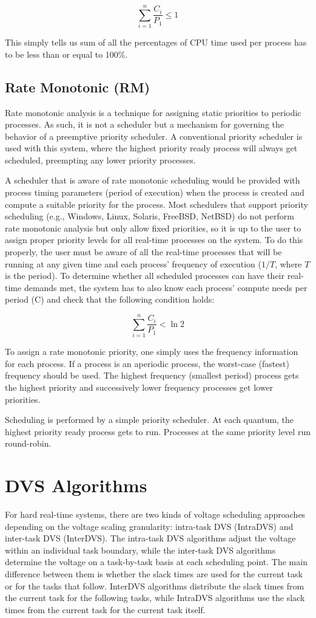 \documentclass[10pt,article]{IEEEtran}
\begin{document}
$$\sum_{i = 1}^{n} \frac{C_i}{P_1} \leq 1$$

This simply tells us sum of all the percentages of CPU time used per process has to be less than or equal to 100\%. 

\subsection{Rate Monotonic (RM)}
 Rate monotonic analysis is a technique for assigning static priorities to periodic processes. As such, it is not a scheduler but a mechanism for governing the behavior of a preemptive priority scheduler. A conventional priority scheduler is used with this system, where the highest priority ready process will always get scheduled, preempting any lower priority processes.

A scheduler that is aware of rate monotonic scheduling would be provided with process timing parameters (period of execution) when the process is created and compute a suitable priority for the process. Most schedulers that support priority scheduling (e.g., Windows, Linux, Solaris, FreeBSD, NetBSD) do not perform rate monotonic analysis but only allow fixed priorities, so it is up to the user to assign proper priority levels for all real-time processes on the system. To do this properly, the user must be aware of all the real-time processes that will be running at any given time and each process' frequency of execution ($1/T$, where $T$ is the period). To determine whether all scheduled processes can have their real-time demands met, the system has to also know each process' compute needs per period (C) and check that the following condition holds: 

$$\sum_{i = 1}^{n} \frac{C_i}{P_1} < \ln 2$$

To assign a rate monotonic priority, one simply uses the frequency information for each process. If a process is an aperiodic process, the worst-case (fastest) frequency should be used. The highest frequency (smallest period) process gets the highest priority and successively lower frequency processes get lower priorities.

Scheduling is performed by a simple priority scheduler. At each quantum, the highest priority ready process gets to run. Processes at the same priority level run round-robin.

\section{DVS Algorithms}
For hard real-time systems, there are two kinds of voltage scheduling approaches depending on the voltage scaling granularity:  intra-task DVS (IntraDVS) and inter-task DVS (InterDVS). The intra-task DVS algorithms adjust the voltage within an individual task boundary, while the inter-task DVS algorithms determine the voltage on a task-by-task basis at each scheduling point. The main difference between them is whether the slack times are used for the current task or for the tasks that follow.  InterDVS algorithms distribute the slack times from the current task for the following tasks, while IntraDVS algorithms use the slack times from the current task for the current task itself.
\end{document}
